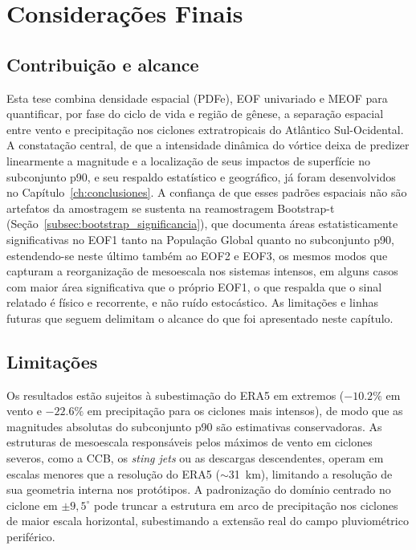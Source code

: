 \chapter{Considerações Finais}\label{cap:Considerações}

\section{Contribuição e alcance}

Esta tese combina densidade espacial (PDFe), EOF univariado e MEOF para quantificar, por fase do ciclo de vida e região de gênese, a separação espacial entre vento e precipitação nos ciclones extratropicais do Atlântico Sul-Ocidental. A constatação central, de que a intensidade dinâmica do vórtice deixa de predizer linearmente a magnitude e a localização de seus impactos de superfície no subconjunto p90, e seu respaldo estatístico e geográfico, já foram desenvolvidos no Capítulo~\ref{ch:conclusiones}. A confiança de que esses padrões espaciais não são artefatos da amostragem se sustenta na reamostragem Bootstrap-t (Seção~\ref{subsec:bootstrap_significancia}), que documenta áreas estatisticamente significativas no EOF1 tanto na População Global quanto no subconjunto p90, estendendo-se neste último também ao EOF2 e EOF3, os mesmos modos que capturam a reorganização de mesoescala nos sistemas intensos, em alguns casos com maior área significativa que o próprio EOF1, o que respalda que o sinal relatado é físico e recorrente, e não ruído estocástico. As limitações e linhas futuras que seguem delimitam o alcance do que foi apresentado neste capítulo.

\section{Limitações}

Os resultados estão sujeitos à subestimação do ERA5 em extremos ($-10.2\%$ em vento e $-22.6\%$ em precipitação para os ciclones mais intensos), de modo que as magnitudes absolutas do subconjunto p90 são estimativas conservadoras. As estruturas de mesoescala responsáveis pelos máximos de vento em ciclones severos, como a CCB, os \textit{sting jets} ou as descargas descendentes, operam em escalas menores que a resolução do ERA5 ($\sim$31~km), limitando a resolução de sua geometria interna nos protótipos. A padronização do domínio centrado no ciclone em $\pm 9{,}5^{\circ}$ pode truncar a estrutura em arco de precipitação nos ciclones de maior escala horizontal, subestimando a extensão real do campo pluviométrico periférico.

